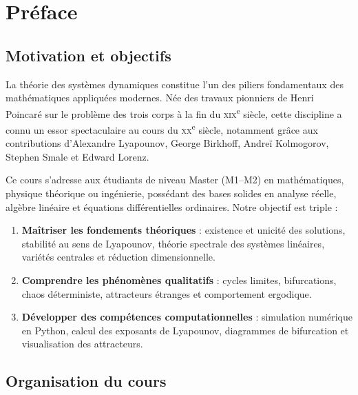 \chapter*{Pr\'eface}

\section*{Motivation et objectifs}

La th\'eorie des syst\`emes dynamiques constitue l'un des piliers fondamentaux
des math\'ematiques appliqu\'ees modernes. N\'ee des travaux pionniers de
Henri Poincar\'e sur le probl\`eme des trois corps \`a la fin du
\textsc{xix}\textsuperscript{e} si\`ecle, cette discipline a connu un
essor spectaculaire au cours du \textsc{xx}\textsuperscript{e} si\`ecle,
notamment gr\^ace aux contributions d'Alexandre Lyapounov, George Birkhoff,
Andre\"i Kolmogorov, Stephen Smale et Edward Lorenz.

Ce cours s'adresse aux \'etudiants de niveau Master (M1--M2) en
math\'ematiques, physique th\'eorique ou ing\'enierie, poss\'edant des bases
solides en analyse r\'eelle, alg\`ebre lin\'eaire et \'equations
diff\'erentielles ordinaires. Notre objectif est triple :

\begin{enumerate}
    \item \textbf{Ma\^itriser les fondements th\'eoriques} : existence et
    unicit\'e des solutions, stabilit\'e au sens de Lyapounov, th\'eorie
    spectrale des syst\`emes lin\'eaires, vari\'et\'es centrales et r\'eduction
    dimensionnelle.

    \item \textbf{Comprendre les ph\'enom\`enes qualitatifs} : cycles limites,
    bifurcations, chaos d\'eterministe, attracteurs \'etranges et
    comportement ergodique.

    \item \textbf{D\'evelopper des comp\'etences computationnelles} :
    simulation num\'erique en Python, calcul des exposants de Lyapounov,
    diagrammes de bifurcation et visualisation des attracteurs.
\end{enumerate}

\section*{Organisation du cours}

